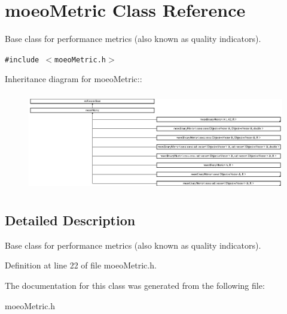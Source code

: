 \section{moeo\-Metric Class Reference}
\label{classmoeoMetric}
Base class for performance metrics (also known as quality indicators).  


{\tt \#include $<$moeo\-Metric.h$>$}

Inheritance diagram for moeo\-Metric::\begin{figure}[H]
\begin{center}
\leavevmode
\includegraphics[height=4.31433cm]{classmoeoMetric}
\end{center}
\end{figure}


\subsection{Detailed Description}
Base class for performance metrics (also known as quality indicators). 



Definition at line 22 of file moeo\-Metric.h.

The documentation for this class was generated from the following file:\begin{CompactItemize}
\item 
moeo\-Metric.h\end{CompactItemize}
